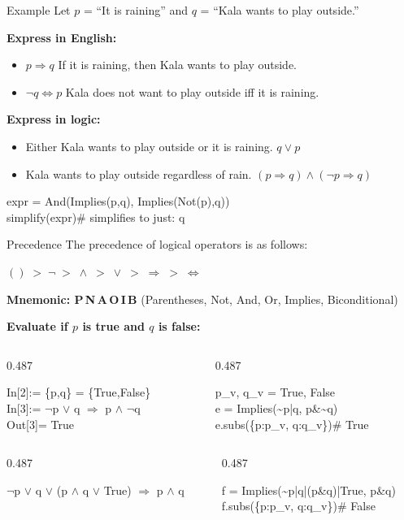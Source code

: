 \documentclass[aspectratio=169]{beamer}
\newcommand{\dualcols}[2]{%
  \begin{columns}[T,onlytextwidth]
    \begin{column}{0.487\textwidth}
      \begin{tcolorbox}[wfstyle]#1\end{tcolorbox}
    \end{column}
    \begin{column}{0.487\textwidth}
      \begin{tcolorbox}[spstyle]#2\end{tcolorbox}
    \end{column}
  \end{columns}
}
\begin{document}
\begin{frame}[t]{Example}
  Let $p$ = ``It is raining'' and $q$ = ``Kala wants to play outside.''
  \vspace{0.5em}

  \textbf{Express in English:}
  \begin{itemize}
    \item $p \Rightarrow q$ \hfill
          If it is raining, then Kala wants to play outside.
    \item $\neg q \Leftrightarrow p$ \hfill
          Kala does not want to play outside iff it is raining.
  \end{itemize}
  \vspace{0.5em}

  \textbf{Express in logic:}
  \begin{itemize}
    \item Either Kala wants to play outside or it is raining.
          \hfill $q \vee p$
    \item Kala wants to play outside regardless of rain.
          \hfill $(p \Rightarrow q) \wedge (\neg p \Rightarrow q)$
  \end{itemize}
  \vspace{0.4em}

  \begin{tcolorbox}[spstyle, title=SymPy --- simplification]
    expr = And(Implies(p,q), Implies(Not(p),q))\\
    simplify(expr)\quad\# simplifies to just: q
  \end{tcolorbox}
\end{frame}

\begin{frame}[t]{Precedence}
  The precedence of logical operators is as follows:
  \begin{center}
    \large$() \;>\; \neg \;>\; \wedge \;>\; \vee \;>\; \Rightarrow \;>\; \Leftrightarrow$
  \end{center}
  \begin{center}
    \colorbox{orange!20}{\textbf{Mnemonic: P\,N\,A\,O\,I\,B}
    (Parentheses, Not, And, Or, Implies, Biconditional)}
  \end{center}
  \vspace{0.4em}
  \textbf{Evaluate if $p$ is true and $q$ is false:}
  \vspace{2pt}
  \dualcols{%
    In[2]:= \{p,q\} = \{True,False\}\\
    In[3]:= $\neg$p $\vee$ q $\Rightarrow$ p $\wedge$ $\neg$q\\
    Out[3]= True
  }{%
    p\_v, q\_v = True, False\\
    e = Implies(\textasciitilde{}p|q, p\&\textasciitilde{}q)\\
    e.subs(\{p:p\_v, q:q\_v\})\quad\# True
  }
  \vspace{0.3em}
  \dualcols{%
    $\neg$p $\vee$ q $\vee$ (p $\wedge$ q $\vee$ True) $\Rightarrow$ p $\wedge$ q
  }{%
    f = Implies(\textasciitilde{}p|q|(p\&q)|True, p\&q)\\
    f.subs(\{p:p\_v, q:q\_v\})\quad\# False
  }
\end{frame}
\end{document}
